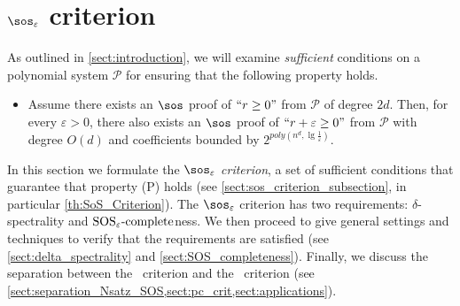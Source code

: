 \documentclass[11pt]{article}
\newcommand{\SOSe}{\rm{SOS}_\varepsilon\text{-complete}}
\begin{document}
\section[SoS epsilon criterion]{$\sos_\varepsilon$ criterion}\label{sect:sos-criterion}
As outlined in \cref{sect:introduction}, we will examine \emph{sufficient} conditions on a polynomial system \(\mathcal{P}\) for ensuring that the following property holds.
\begin{itemize}[label=$(\rm{P})$]
    \item \label{prob:1} Assume there exists an $\sos$ proof of $``r \geq 0"$ from $\mathcal{P}$ of degree $2d$. Then, for every $\varepsilon>0$, there also exists an $\sos$ proof of $``r +\varepsilon \geq 0"$ from $\mathcal{P}$ with degree $O(d)$ and coefficients bounded by $2^{poly(n^d,\lg \frac{1}{\varepsilon})}$.
\end{itemize}

In this section we formulate the \emph{$\sos_{\varepsilon}$ criterion}, a set of sufficient conditions that guarantee that property (\textsc{P}) holds (see \cref{sect:sos_criterion_subsection}, in particular \cref{th:SoS_Criterion}). The $\sos_{\varepsilon}$ criterion has two requirements: $\delta$-spectrality and $\SOSe$ness. We then proceed to give general settings and techniques to verify that the requirements are satisfied (see \cref{sect:delta_spectrality} and \cref{sect:SOS_completeness}). Finally, we discuss the separation between the \Nsatz\ criterion and the \sos\ criterion (see \cref{sect:separation_Nsatz_SOS,sect:pc_crit,sect:applications}).
\end{document}
